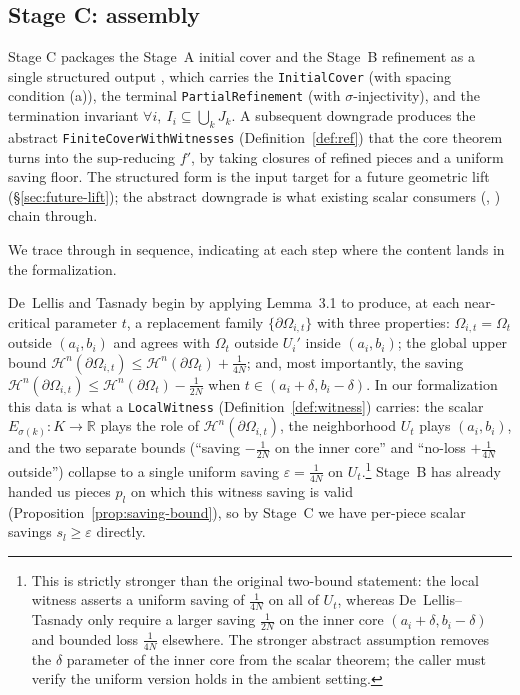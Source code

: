 \subsection{Stage C: assembly}

Stage C packages the Stage~A initial cover and the Stage~B
refinement as a single structured output
, which carries the
\texttt{InitialCover} (with spacing condition (a)), the terminal
\texttt{PartialRefinement} (with $\sigma$-injectivity), and the
termination invariant $\forall i,\ I_i \subseteq \bigcup_k J_k$.
A subsequent downgrade
 produces the
abstract \texttt{FiniteCoverWithWitnesses} (Definition~\ref{def:ref})
that the core theorem turns into the sup-reducing $f'$, by taking
closures of refined pieces and a uniform saving floor. The
structured form is the input target for a future geometric lift
(\S\ref{sec:future-lift}); the abstract downgrade is what existing
scalar consumers
(,
) chain through.

We trace through \cite[\S3.2, Step~2]{DLT13} in sequence,
indicating at each step where the content lands in the
formalization.

De~Lellis and Tasnady begin by applying Lemma~3.1 to produce, at
each near-critical parameter $t$, a replacement family
$\{\partial \Omega_{i,t}\}$ with three properties:
$\Omega_{i,t} = \Omega_t$ outside $(a_i, b_i)$ and agrees with
$\Omega_t$ outside $U_i'$ inside $(a_i, b_i)$; the global upper
bound $\mathcal{H}^n(\partial \Omega_{i,t}) \le
\mathcal{H}^n(\partial \Omega_t) + \tfrac{1}{4N}$; and, most
importantly, the saving
$\mathcal{H}^n(\partial \Omega_{i,t}) \le
\mathcal{H}^n(\partial \Omega_t) - \tfrac{1}{2N}$ when
$t \in (a_i + \delta, b_i - \delta)$. In our formalization this
data is what a \texttt{LocalWitness} (Definition~\ref{def:witness})
carries: the scalar $E_{\sigma(k)} : K \to \mathbb{R}$ plays the
role of $\mathcal{H}^n(\partial \Omega_{i,t})$, the neighborhood
$U_t$ plays $(a_i, b_i)$, and the two separate bounds
(``saving $-\tfrac{1}{2N}$ on the inner core'' and ``no-loss
$+\tfrac{1}{4N}$ outside'') collapse to a single uniform saving
$\varepsilon = \tfrac{1}{4N}$ on $U_t$.\footnote{This is strictly
stronger than the original two-bound statement: the local witness
asserts a uniform saving of $\tfrac{1}{4N}$ on all of $U_t$,
whereas De~Lellis--Tasnady only require a larger saving
$\tfrac{1}{2N}$ on the inner core $(a_i+\delta, b_i-\delta)$ and
bounded loss $\tfrac{1}{4N}$ elsewhere. The stronger abstract
assumption removes the $\delta$ parameter of the inner core from
the scalar theorem; the caller must verify the uniform version
holds in the ambient setting.}
Stage~B has already handed us pieces $p_l$ on which this witness
saving is valid (Proposition~\ref{prop:saving-bound}), so by
Stage~C we have per-piece scalar savings $s_l \ge \varepsilon$
directly.

